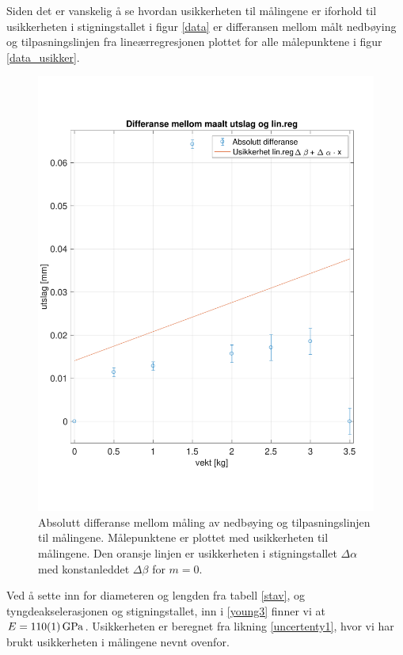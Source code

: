 \documentclass[%
 reprint,
 amsmath,amssymb,
 aps,
 norsk,
 booktabs
]{revtex4-1}
\begin{document}
Siden det er vanskelig å se hvordan usikkerheten til målingene er iforhold til usikkerheten i stigningstallet i figur \vref{data} er differansen mellom målt nedbøying og tilpasningslinjen fra lineærregresjonen plottet for alle målepunktene i figur \vref{data_usikker}.
\begin{figure}[h!]
  \centering
  \includegraphics[scale=0.4]{usikkerhet.pdf}
  \caption{Absolutt differanse mellom måling av nedbøying og tilpasningslinjen til målingene. Målepunktene er plottet med usikkerheten til målingene. Den oransje linjen er usikkerheten i stigningstallet $\Delta \alpha$ med konstanleddet $\Delta \beta$ for $m=0$.}
  \label{data_usikker}
\end{figure}
Ved å sette inn for diameteren og lengden fra tabell \vref{stav}, og tyngdeakselerasjonen og stigningstallet, inn i \eqref{young3} finner vi at $E=\SI{110\pm1}{\giga\pascal}$. Usikkerheten er beregnet fra likning \eqref{uncertenty1}, hvor vi har brukt usikkerheten i målingene nevnt ovenfor.
\end{document}
